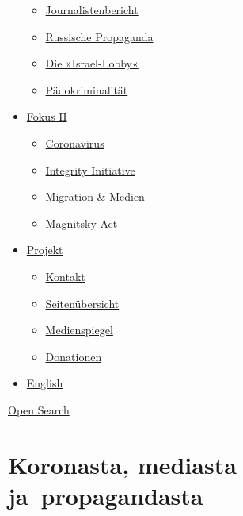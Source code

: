 \begin{itemize}
  \begin{itemize}
  \tightlist
  \item
    \href{https://swprs.org/bericht-eines-journalisten/}{Journalistenbericht}
  \item
    \href{https://swprs.org/russische-propaganda/}{Russische Propaganda}
  \item
    \href{https://swprs.org/die-israel-lobby-fakten-und-mythen/}{Die
    »Israel-Lobby«}
  \item
    \href{https://swprs.org/geopolitik-und-paedokriminalitaet/}{Pädokriminalität}
  \end{itemize}
\item
  \href{https://swprs.org/migration-und-medien/}{Fokus II}

  \begin{itemize}
  \tightlist
  \item
    \href{https://swprs.org/covid-19-hinweis-ii/}{Coronavirus}
  \item
    \href{https://swprs.org/die-integrity-initiative/}{Integrity
    Initiative}
  \item
    \href{https://swprs.org/migration-und-medien/}{Migration \& Medien}
  \item
    \href{https://swprs.org/der-fall-magnitsky/}{Magnitsky Act}
  \end{itemize}
\item
  \href{https://swprs.org/kontakt/}{Projekt}

  \begin{itemize}
  \tightlist
  \item
    \href{https://swprs.org/kontakt/}{Kontakt}
  \item
    \href{https://swprs.org/uebersicht/}{Seitenübersicht}
  \item
    \href{https://swprs.org/medienspiegel/}{Medienspiegel}
  \item
    \href{https://swprs.org/donationen/}{Donationen}
  \end{itemize}
\item
  \href{https://swprs.org/contact/}{English}
\end{itemize}

\protect\hyperlink{}{Open Search}

\hypertarget{koronasta-mediasta-ja-propagandasta}{%
\section{Koronasta, mediasta
ja~propagandasta}\label{koronasta-mediasta-ja-propagandasta}}

